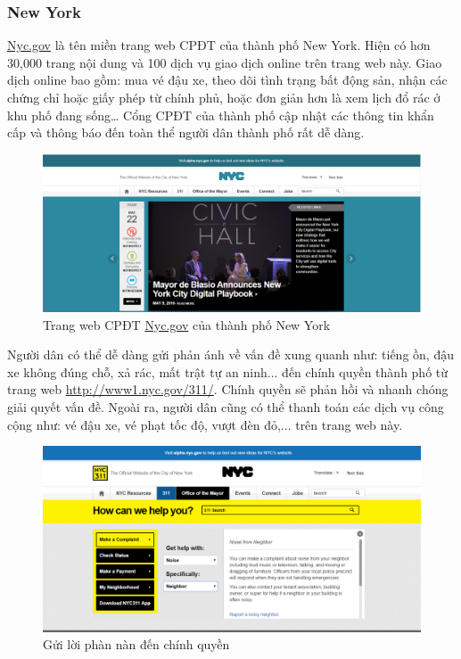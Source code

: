 \documentclass[a4paper]{article}
\begin{document}
\subsubsection{New York}
\url{Nyc.gov} là tên miền trang web CPĐT của thành phố New York. Hiện có hơn 30,000 trang nội dung và 100 dịch vụ giao dịch online trên trang web này. Giao dịch online bao gồm: mua vé đậu xe, theo dõi tình trạng bất động sản, nhận các chứng chỉ hoặc giấy phép từ chính phủ, hoặc đơn giản hơn là xem lịch đổ rác ở khu phố đang sống… Cổng CPĐT của thành phố cập nhật các thông tin khẩn cấp và thông báo đến toàn thể người dân thành phố rất dễ dàng.
\newpage
\begin{center}
    \begin{figure}[t]
    \begin{center}
     \includegraphics[scale=.34]{newyork.PNG}
    \end{center}
    \caption{Trang web CPĐT \url{Nyc.gov} của thành phố New York}
    \label{refhinh2}
    \end{figure}
\end{center}
Người dân có thể dễ dàng gửi phản ánh về vấn đề xung quanh như: tiếng ồn, đậu xe không đúng chỗ, xả rác, mất trật tự an ninh... đến chính quyền thành phố từ trang web \url{http://www1.nyc.gov/311/}. Chính quyền sẽ phản hồi và nhanh chóng giải quyết vấn đề. Ngoài ra, người dân cũng có thể thanh toán các dịch vụ công cộng như: vé đậu xe, vé phạt tốc độ, vượt đèn đỏ,... trên trang web này.
\begin{center}
    \begin{figure}[h]
    \begin{center}
     \includegraphics[scale=.41]{newyork_complaint.PNG}
    \end{center}
    \caption{Gửi lời phàn nàn đến chính quyền}
    \label{refhinh2}
    \end{figure}
\end{center}
\end{document}
